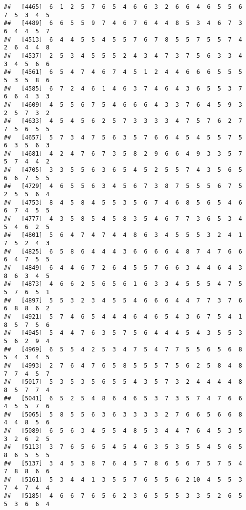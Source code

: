 \documentclass[
]{book}
\begin{document}
\begin{verbatim}
##   [4465]  6  1  2  5  7  6  5  4  6  6  3  2  6  6  4  6  5  5  6  7  5  3  4  5
##   [4489]  6  6  5  5  9  7  4  6  7  6  4  4  8  5  3  4  6  7  3  6  4  4  5  7
##   [4513]  6  4  4  5  5  4  5  5  7  6  7  8  5  5  7  5  5  7  4  2  6  4  4  8
##   [4537]  2  5  3  4  5  5  5  2  4  3  4  7  3  7  5  6  3  3  4  3  4  5  6  6
##   [4561]  6  5  4  7  4  6  7  4  5  1  2  4  4  6  6  6  5  5  5  5  3  5  8  6
##   [4585]  6  7  2  4  6  1  4  6  3  7  4  6  4  3  6  5  5  3  7  6  6  4  3  3
##   [4609]  4  5  5  6  7  5  4  6  6  6  4  3  3  7  6  4  5  9  3  2  5  7  3  2
##   [4633]  4  5  4  5  6  2  5  7  3  3  3  3  4  7  5  7  6  2  7  7  5  6  5  5
##   [4657]  5  7  3  4  7  5  6  3  5  7  6  6  4  5  4  5  5  7  5  6  3  5  6  3
##   [4681]  4  2  4  7  6  7  3  5  8  2  9  6  6  4  9  3  3  5  7  5  7  4  4  2
##   [4705]  3  3  5  5  6  3  6  5  4  5  2  5  5  7  4  3  5  6  5  6  6  7  5  5
##   [4729]  4  6  5  5  6  3  4  5  6  7  3  8  7  5  5  5  6  7  5  2  5  5  6  4
##   [4753]  8  4  5  8  4  5  5  3  5  6  7  4  6  8  5  6  5  4  6  6  7  4  5  5
##   [4777]  4  3  5  8  5  4  5  8  3  5  4  6  7  7  3  6  5  3  4  5  4  6  2  5
##   [4801]  5  6  4  7  4  7  4  4  8  6  3  4  5  5  5  3  2  4  1  7  5  2  4  3
##   [4825]  6  5  8  6  4  4  4  3  6  6  6  6  4  8  7  4  7  6  6  6  4  7  5  5
##   [4849]  6  4  4  6  7  2  6  4  5  5  7  6  6  3  4  4  6  4  3  8  6  3  4  5
##   [4873]  4  6  6  2  5  6  5  6  1  6  3  3  4  5  5  5  4  7  5  5  7  6  5  1
##   [4897]  5  5  3  2  3  4  5  5  4  6  6  6  4  4  7  7  3  7  6  6  8  8  6  2
##   [4921]  5  7  4  6  5  4  4  4  6  4  6  5  4  3  6  7  5  4  1  8  5  7  5  6
##   [4945]  5  4  4  7  6  3  5  7  5  6  4  4  4  5  4  3  5  5  3  5  6  2  9  4
##   [4969]  6  5  5  4  2  5  3  4  7  5  4  7  7  5  5  6  5  6  8  5  4  3  4  5
##   [4993]  2  7  6  4  7  6  5  8  5  5  5  7  5  6  2  5  8  4  8  7  7  4  5  7
##   [5017]  5  3  5  3  5  6  5  5  4  3  5  7  3  2  4  4  4  4  8  8  5  7  7  4
##   [5041]  6  5  2  5  4  8  6  4  6  5  3  7  3  5  7  4  7  6  6  4  5  5  7  6
##   [5065]  5  8  5  5  6  3  6  3  3  3  3  2  7  6  6  5  6  6  8  4  4  8  5  6
##   [5089]  6  5  6  3  4  5  5  4  8  5  3  4  4  7  6  4  5  3  5  3  2  6  2  5
##   [5113]  3  7  6  5  6  5  4  5  4  6  3  5  3  5  5  4  5  6  5  8  6  5  5  5
##   [5137]  3  4  5  3  8  7  6  4  5  7  8  6  5  6  7  5  7  5  4  7  8  8  6  6
##   [5161]  5  3  4  4  1  3  5  5  7  6  5  5  6  2 10  4  5  5  3  7  4  7  4  4
##   [5185]  4  6  6  7  6  5  6  2  3  6  5  5  5  3  3  5  2  6  5  5  3  6  6  4

\end{verbatim}
\end{document}
